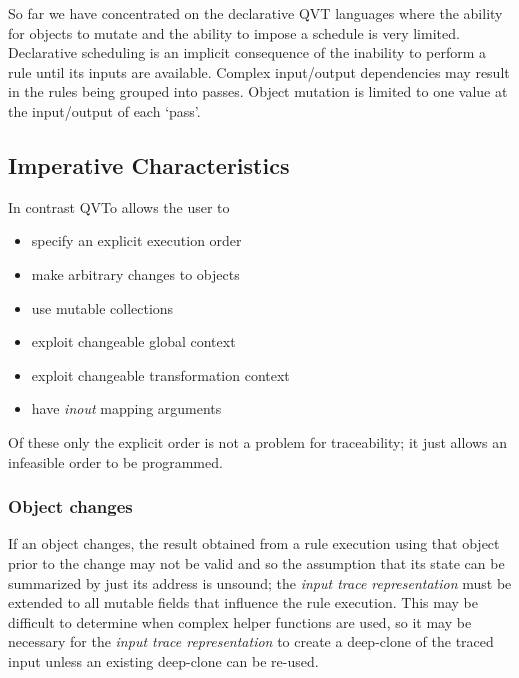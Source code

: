 \documentclass[runningheads,a4paper]{llncs}
\begin{document}
So far we have concentrated on the declarative QVT languages where the ability for objects to mutate and the ability to impose a schedule is very limited. Declarative scheduling is an implicit consequence of the inability to perform a rule until its inputs are available. Complex input/output dependencies may result in the rules being grouped into passes. Object mutation is limited to one value at the input/output of each `pass'.

\subsection{Imperative Characteristics}

In contrast QVTo allows the user to
\begin{itemize}
\item specify an explicit execution order
\item make arbitrary changes to objects
\item use mutable collections
\item exploit changeable global context
\item exploit changeable transformation context
\item have \emph{inout} mapping arguments
\end{itemize}

Of these only the explicit order is not a problem for traceability; it just allows an infeasible order to be programmed.

\subsubsection{Object changes}

If an object changes, the result obtained from a rule execution using that object prior to the change may not be valid and so the assumption that its state can be summarized by just its address is unsound; the \emph{input trace representation} must be extended to all mutable fields that influence the rule execution. This may be difficult to determine when complex helper functions are used, so it may be necessary for the \emph{input trace representation} to create a deep-clone of the traced input unless an existing deep-clone can be re-used.

\end{document}
